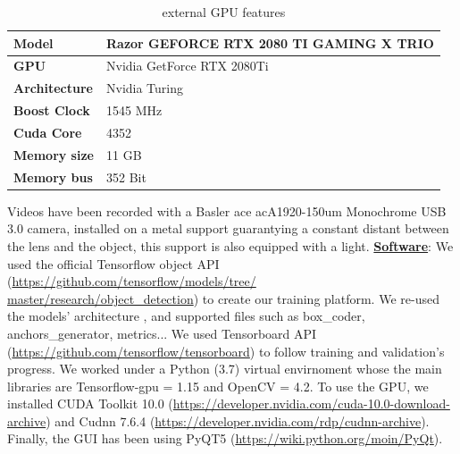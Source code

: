 \documentclass[12pt, french, a4paper]{article} %
\newcommand{\link}[1]{{\color{Blue}\scriptsize\href{#1}{#1}}}
\begin{document}
 
\begin{table}[h]
\begin{center}
\begin{tabular}{|l|l|}
\hline
\textbf{Model}  & Razor GEFORCE RTX 2080 TI GAMING X TRIO \\ \hline
\textbf{GPU}   & Nvidia GetForce RTX 2080Ti    \\ \hline
\textbf{Architecture} & Nvidia Turing       \\ \hline
\textbf{Boost Clock} & 1545 MHz         \\ \hline
\textbf{Cuda Core} & 4352          \\ \hline
\textbf{Memory size} & 11 GB         \\ \hline
\textbf{Memory bus} & 352 Bit         \\ \hline
\end{tabular}
\caption{external GPU features}
\end{center}
\end{table}
 Videos have been recorded with a Basler ace acA1920-150um Monochrome USB 3.0 camera, installed on a metal support guarantying a constant distant between the lens and the object, this support is also equipped with a light. 
\hspace{-0.8cm}\textbf{\underline{Software}}: We used the official Tensorflow object API (\link{https://github.com/tensorflow/models/tree/ \\ master/research/object\_detection}) to create our training platform. We re-used the models' architecture \cite{szegedy2017inception, huang2017speed, ren2015faster}, and supported files such as box\_coder, anchors\_generator, metrics... We used Tensorboard API (\link{https://github.com/tensorflow/tensorboard}) to follow training and validation's progress. We worked under a Python (3.7) virtual envirnoment whose the main libraries are Tensorflow-gpu = 1.15 and OpenCV = 4.2. To use the \gls{GPU}, we installed CUDA Toolkit 10.0 (\link{https://developer.nvidia.com/cuda-10.0-download-archive}) and Cudnn 7.6.4 (\link{https://developer.nvidia.com/rdp/cudnn-archive}). Finally, the \gls{GUI} has been using PyQT5 (\link{https://wiki.python.org/moin/PyQt}).
\end{document}
